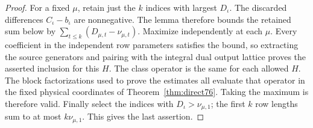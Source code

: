 \documentclass[a4paper,11pt]{article}
\theoremstyle{definition}
\theoremstyle{remark}
\numberwithin{equation}{section}
\begin{document}
\begin{proof}
For a fixed \(\mu\), retain just the \(k\) indices with largest
\(D_\iota\). The discarded differences \(C_\iota-b_\iota\)
are nonnegative. The lemma therefore bounds the retained sum
below by \(\sum_{t\le k}(D_{\mu,t}-\nu_{\mu,t})\).
Maximize independently at each \(\mu\). Every coefficient in
the independent row parameters satisfies the bound, so extracting
the source generators and pairing with the integral dual output
lattice proves the asserted inclusion for this \(H\). The class
operator is the same for each allowed \(H\). The block
factorizations used to prove the estimates all evaluate that
operator in the fixed physical coordinates of
Theorem~\ref{thm:direct76}. Taking the maximum is therefore valid.
Finally select the indices with \(D_\iota>\nu_{\mu,1}\); the
first \(k\) row lengths sum to at most \(k\nu_{\mu,1}\).
This gives the last assertion.
\end{proof}
\end{document}

